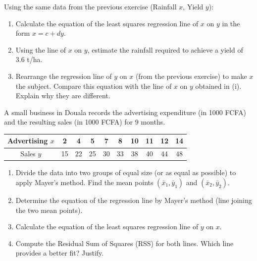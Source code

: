 \documentclass[11pt]{article}
\begin{document}
\begin{exercice}
Using the same data from the previous exercise (Rainfall $x$, Yield $y$):
\begin{enumerate}
    \item Calculate the equation of the least squares regression line of $x$ on $y$ in the form $x = c + dy$.
    \item Using the line of $x$ on $y$, estimate the rainfall required to achieve a yield of $3.6$ t/ha.
    \item Rearrange the regression line of $y$ on $x$ (from the previous exercise) to make $x$ the subject. Compare this equation with the line of $x$ on $y$ obtained in (i). Explain why they are different.
\end{enumerate}
\end{exercice}

\begin{exercice}
A small business in Douala records the advertising expenditure (in 1000 FCFA) and the resulting sales (in 1000 FCFA) for 9 months.

\begin{center}
\begin{tabular}{|c|c|c|c|c|c|c|c|c|c|}
\hline
Advertising $x$ & 2 & 4 & 5 & 7 & 8 & 10 & 11 & 12 & 14 \\
\hline
Sales $y$ & 15 & 22 & 25 & 30 & 33 & 38 & 40 & 44 & 48 \\
\hline
\end{tabular}
\end{center}

\begin{enumerate}
    \item Divide the data into two groups of equal size (or as equal as possible) to apply Mayer's method. Find the mean points $(\bar{x}_1, \bar{y}_1)$ and $(\bar{x}_2, \bar{y}_2)$.
    \item Determine the equation of the regression line by Mayer's method (line joining the two mean points).
    \item Calculate the equation of the least squares regression line of $y$ on $x$.
    \item Compute the Residual Sum of Squares (RSS) for both lines. Which line provides a better fit? Justify.
\end{enumerate}
\end{exercice}
\end{document}
